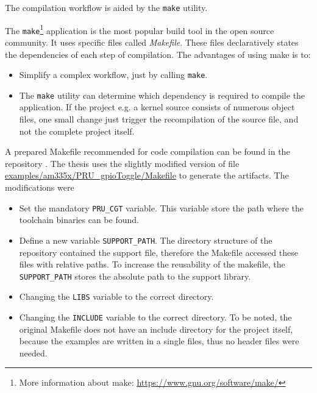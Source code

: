The compilation workflow is aided by the \verb+make+ utility.

The \verb+make+\footnote{More information about make: \url{https://www.gnu.org/software/make/}} application is the most popular build tool in the open source community. It uses specific files called \emph{Makefile}. These files declaratively states the dependencies of each step of compilation. The advantages of using make is to:
\begin{itemize}
	\item Simplify a complex workflow, just by calling \verb+make+.
	\item The \verb+make+ utility can determine which dependency is required to compile the application. If the project e.g. a kernel source consists of numerous object files, one small change just trigger the recompilation of the source file, and not the complete project itself.
\end{itemize}

A prepared Makefile recommended for \pru code compilation can be found in the repository \citep{TI_PRUSS_REPO}. The thesis uses the slightly modified version of  file \url{examples/am335x/PRU_gpioToggle/Makefile} to generate the artifacts. The modifications were
\begin{itemize}
	\item Set the mandatory \verb+PRU_CGT+ variable. This variable store the path where the toolchain binaries can be found.
	\item Define a new variable \verb+SUPPORT_PATH+. The directory structure of the repository contained the support file, therefore the Makefile accessed these files with relative paths. To increase the reusability of the makefile, the \verb+SUPPORT_PATH+ stores the absolute path to the support library.
	\item Changing the \verb+LIBS+ variable to the correct directory.
	\item Changing the \verb+INCLUDE+ variable to the correct directory. To be noted, the original Makefile does not have an include directory for the project itself, because the examples are written in a single files, thus no header files were needed.
\end{itemize}

